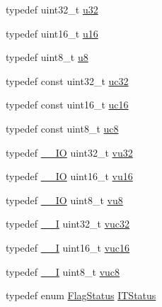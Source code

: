 \begin{DoxyCompactItemize}
typedef uint32\+\_\+t \mbox{\hyperlink{group___exported__types_gafaa62991928fb9fb18ff0db62a040aba}{u32}}
\item 
typedef uint16\+\_\+t \mbox{\hyperlink{group___exported__types_gace9d960e74685e2cd84b36132dbbf8aa}{u16}}
\item 
typedef uint8\+\_\+t \mbox{\hyperlink{group___exported__types_ga92c50087ca0e64fa93fc59402c55f8ca}{u8}}
\item 
typedef const uint32\+\_\+t \mbox{\hyperlink{group___exported__types_ga5b628e6a05856ff67e535fa391a57683}{uc32}}
\item 
typedef const uint16\+\_\+t \mbox{\hyperlink{group___exported__types_gabc715ea3779494b5a4f53173a397f7cb}{uc16}}
\item 
typedef const uint8\+\_\+t \mbox{\hyperlink{group___exported__types_gac74022c74a461f810e0d4fdc9bfea480}{uc8}}
\item 
typedef \mbox{\hyperlink{core__sc300_8h_aec43007d9998a0a0e01faede4133d6be}{\+\_\+\+\_\+\+IO}} uint32\+\_\+t \mbox{\hyperlink{group___exported__types_ga0cd21c4793673b69ecd5fd673353a145}{vu32}}
\item 
typedef \mbox{\hyperlink{core__sc300_8h_aec43007d9998a0a0e01faede4133d6be}{\+\_\+\+\_\+\+IO}} uint16\+\_\+t \mbox{\hyperlink{group___exported__types_ga93d1a6b3dcfdded10a7b15548679fe0a}{vu16}}
\item 
typedef \mbox{\hyperlink{core__sc300_8h_aec43007d9998a0a0e01faede4133d6be}{\+\_\+\+\_\+\+IO}} uint8\+\_\+t \mbox{\hyperlink{group___exported__types_ga4a8fa9a2b4796540a6d65a04eb18e111}{vu8}}
\item 
typedef \mbox{\hyperlink{core__sc300_8h_af63697ed9952cc71e1225efe205f6cd3}{\+\_\+\+\_\+I}} uint32\+\_\+t \mbox{\hyperlink{group___exported__types_ga2e08e321a35a55e72c5b3a507e76371f}{vuc32}}
\item 
typedef \mbox{\hyperlink{core__sc300_8h_af63697ed9952cc71e1225efe205f6cd3}{\+\_\+\+\_\+I}} uint16\+\_\+t \mbox{\hyperlink{group___exported__types_ga7f6037565f0caa27727c8b871daf0d56}{vuc16}}
\item 
typedef \mbox{\hyperlink{core__sc300_8h_af63697ed9952cc71e1225efe205f6cd3}{\+\_\+\+\_\+I}} uint8\+\_\+t \mbox{\hyperlink{group___exported__types_gab0ec90ac9b2c5864755998c8d37c264a}{vuc8}}
\item 
typedef enum \mbox{\hyperlink{group___exported__types_ga89136caac2e14c55151f527ac02daaff}{Flag\+Status}} \mbox{\hyperlink{group___exported__types_gaacbd7ed539db0aacd973a0f6eca34074}{I\+T\+Status}}
\end{DoxyCompactItemize}

